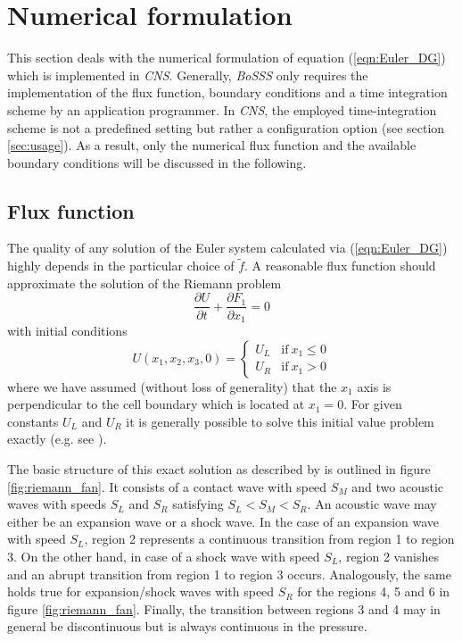 \section{Numerical formulation}
\label{sec:numerics}

This section deals with the numerical formulation of equation
(\ref{eqn:Euler_DG}) which is implemented in \emph{CNS}. Generally, \emph{BoSSS}
only requires the implementation of the flux function, boundary conditions and a
time integration scheme by an application programmer. In \emph{CNS}, the
employed time-integration scheme is not a predefined setting but rather a
configuration option (see section \ref{sec:usage}). As a result, only the
numerical flux function and the available boundary conditions will be discussed
in the following.


\subsection{Flux function}
\label{sec:numerics_flux_function}

The quality of any solution of the Euler system calculated via
(\ref{eqn:Euler_DG}) highly depends in the particular choice of $\tilde{f}$.
A reasonable flux function should approximate the solution of the Riemann
problem
\begin{equation}
	\label{eqn:Riemann_problem}
	\frac{\partial U}{\partial t} + \frac{\partial F_1}{\partial x_1} = 0
\end{equation}
with initial conditions
\begin{equation}
	\label{eqn:Riemann_initial}
	U(x_1, x_2, x_3, 0) =
	\begin{cases}
		U_L & \mathrm{if~} x_1 \leq 0\\
		U_R & \mathrm{if~} x_1 > 0
	\end{cases}
\end{equation}
where we have assumed (without loss of generality) that the $x_1$ axis is
perpendicular to the cell boundary which is located at $x_1=0$. For given
constants $U_L$ and $U_R$ it is generally possible to solve this initial
value problem exactly (e.g. see \cite{Toro2009}).

The basic structure of this exact solution as described by \cite{Batten1997} is
outlined in figure \ref{fig:riemann_fan}. It consists of a contact wave with
speed $S_M$ and two acoustic waves with speeds $S_L$ and $S_R$ satisfying
$S_L < S_M < S_R$. An acoustic wave may either be an expansion wave or a shock
wave. In the case of an expansion wave with speed $S_L$, region 2 represents a
continuous transition from region 1 to region 3. On the other hand, in case of
a shock wave with speed $S_L$, region 2 vanishes and an abrupt transition from
region 1 to region 3 occurs. Analogously, the same holds true for
expansion/shock waves with speed $S_R$ for the regions 4, 5 and 6 in figure
\ref{fig:riemann_fan}. Finally, the transition between regions 3 and 4 may in
general be discontinuous but is always continuous in the pressure.

